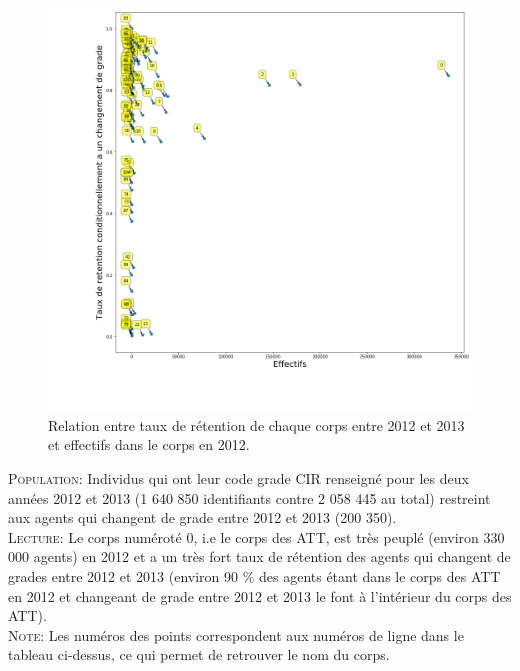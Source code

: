 \documentclass[10pt]{article}
\begin{document}
\begin{landscape}
\begin{figure}[H] 
	\caption{Relation entre taux de rétention de chaque corps entre 2012 et 2013 et effectifs dans le corps en 2012.}
	\label{transit1} 
	\includegraphics[scale = 0.7]{effectifs_tx_retentions_cdt_chgmt_grade.png} 
\end{figure}

	\textsc{Population:} Individus qui ont leur code grade CIR renseigné pour les deux années 2012 et 2013 (1 640 850 identifiants contre 2 058 445 au total) restreint aux agents qui changent de grade entre 2012 et 2013 (200 350).\\
	\indent \textsc{Lecture:} Le corps numéroté 0, i.e le corps des ATT, est très peuplé (environ 330 000 agents) en 2012 et a un très fort taux de rétention des agents qui changent de grades entre 2012 et 2013 (environ 90 \% des agents étant dans le corps des ATT en 2012 et changeant de grade entre 2012 et 2013 le font à l'intérieur du corps des ATT). \\
	\indent \textsc{Note:} Les numéros des points correspondent aux numéros de ligne dans le tableau ci-dessus, ce qui permet de retrouver le nom du corps.

 
\pagebreak



\end{landscape}
\end{document}
